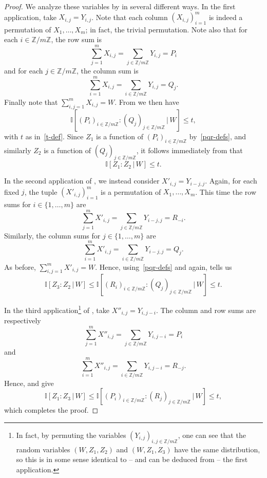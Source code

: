 \documentclass[10pt,a4paper]{article}
\newcommand{\uses}[1]{}
\newcommand{\leanok}{}
\newcommand{\Z}{\mathbb{Z}}
\newcommand{\bbI}{\mathbb{I}}
\begin{document}
\begin{proof}\uses{key, data-process}\leanok
  We analyze these variables by  in several different ways.
  In the first application, take $X_{i,j}=Y_{i,j}$.
  Note that each column $(X_{i,j})_{i=1}^m$ is indeed a permutation of $X_1,\dots,X_m$; in fact, the trivial permutation.
  Note also that for each $i \in \Z/m\Z$, the row sum is
  \[
    \sum_{j=1}^m X_{i,j} = \sum_{j \in \Z/m\Z} Y_{i,j} = P_i
  \]
  and for each $j \in \Z/m\Z$, the column sum is
  \[
    \sum_{i=1}^m X_{i,j} = \sum_{i \in \Z/m\Z} Y_{i,j} = Q_j.
  \]
  Finally note that $\sum_{i,j=1}^m X_{i,j} = W$.
  From  we then have
  \[
    \bbI[ (P_i)_{i \in \Z/m\Z} : (Q_j)_{j \in \Z/m\Z } \,\big|\, W ] \leq t,
  \]
  with $t$ as in~\eqref{t-def}.
  Since $Z_1$ is a function of $(P_i)_{i \in \Z/m\Z}$ by~\eqref{pqr-defs}, and similarly $Z_2$ is a function of $(Q_j)_{j \in \Z/m\Z}$, it follows immediately from  that
  \[
    \bbI[ Z_1 : Z_2 \,|\, W ] \leq t.
  \]

  In the second application of , we instead consider $X'_{i,j} = Y_{i-j,j}$.
  Again, for each fixed $j$, the tuple $(X'_{i,j})_{i=1}^m$ is a permutation of $X_1,\dots,X_m$.
  This time the row sums for $i \in \{1,\dots, m\}$ are
  \[
    \sum_{j=1}^m X'_{i,j} = \sum_{j \in \Z/m\Z} Y_{i-j,j} = R_{-i}.
  \]
 Similarly, the column sums for $j \in \{1,\dots, m\}$ are
  \[
    \sum_{i=1}^m X'_{i,j} = \sum_{i \in \Z/m\Z} Y_{i-j,j} = Q_j.
  \]
  As before, $\sum_{i,j=1}^m X'_{i,j} = W$.
  Hence, using~\eqref{pqr-defs} and  again,  tells us
  \[
    \bbI[ Z_3 :  Z_2 \,|\, W] \leq \bbI[ (R_i)_{i \in \Z/m\Z} : (Q_j)_{j \in \Z/m\Z } \,\big|\, W ] \leq t.
  \]

  In the third application\footnote{In fact, by permuting the variables $(Y_{i,j})_{i,j \in \Z/m\Z}$, one can see that the random variables $(W, Z_1, Z_2)$ and $(W, Z_1, Z_3)$ have the same distribution, so this is in some sense identical to -- and can be deduced from -- the first application.} of , take $X''_{i,j} = Y_{i,j-i}$.
  The column and row sums are respectively
  \[
    \sum_{j=1}^m X''_{i,j} = \sum_{j \in \Z/m\Z} Y_{i,j-i} = P_i \] and
\[     \sum_{i=1}^m X''_{i,j} = \sum_{i \in \Z/m\Z} Y_{i,j-i} = R_{-j}.
  \]
  Hence,  and  give
  \[
    \bbI[ Z_1 : Z_3 \,|\, W] \leq \bbI[ (P_i)_{i \in \Z/m\Z} : (R_j)_{j \in \Z/m\Z } \,\big|\, W ] \leq t,
  \]
  which completes the proof.
\end{proof}
\end{document}
